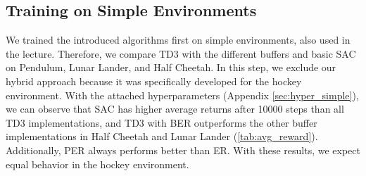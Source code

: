 \subsection{Training on Simple Environments} \label{subsec:simple_eval}

We trained the introduced algorithms first on simple environments, also used in the lecture. Therefore, we compare \ac{TD3} with the different buffers and basic \ac{SAC} on Pendulum, Lunar Lander, and Half Cheetah. In this step, we exclude our hybrid approach because it was specifically developed for the hockey environment. With the attached hyperparameters (Appendix \ref{sec:hyper_simple}), we can observe that \ac{SAC} has higher average returns after 10000 steps than all \ac{TD3} implementations, and \ac{TD3} with \ac{BER} outperforms the other buffer implementations in Half Cheetah and Lunar Lander (\autoref{tab:avg_reward}). Additionally, \ac{PER} always performs better than \ac{ER}. With these results, we expect equal behavior in the hockey environment.


